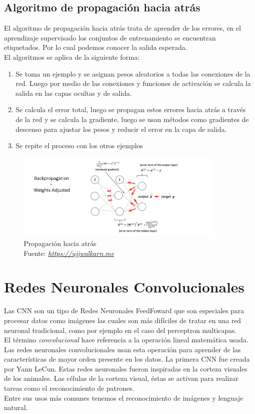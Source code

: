 \subsection{Algoritmo de propagación hacia atrás}
El algoritmo de propagación hacia atrás trata de aprender de los errores, en el aprendizaje supervisado los conjuntos de entrenamiento se encuentran etiquetados. Por lo cual podemos conocer la salida esperada. \\
El algoritmos se aplica de la siguiente forma:

\begin{enumerate}
	\item Se toma un ejemplo y se asignan pesos aleatorios a todas las conexiones de la red. Luego por medio de las conexiones y funciones de activación se calcula la salida en las capas ocultas y de salida.
	\item Se calcula el error total, luego se propagan estos errores hacia atrás a través de la red y se calcula la gradiente, luego se usan métodos como gradientes de descenso para ajustar los pesos y reducir el error en la capa de salida.
	\item Se repite el proceso con los otros ejemplos
\end{enumerate}
\begin{figure}[H]
	\centering
	\includegraphics[width=0.9\textwidth]{Figures/backp.png}
	\caption{Propagación hacia atrás \\ Fuente:  \href{https://ujjwalkarn.me/2016/08/09/quick-intro-neural-networks/}{\textit{https://ujjwalkarn.me}}}
	\label{backpropagation}
\end{figure} 

\section{Redes Neuronales Convolucionales}
Las CNN son un tipo de Redes Neuronales FeedFoward que son especiales para procesar datos como imágenes las cuales son más difíciles de tratar en una red neuronal tradicional, como por ejemplo en el caso del perceptron multicapas.\\ El término \textit{convolucional} hace referencia a la operación lineal matemática usada. Las redes neuronales convolucionales usan esta operación para aprender de las características de mayor orden presente en los datos.
La primera CNN fue creada por Yann LeCun. Estas redes neuronales fueron inspiradas en la corteza visuales de los animales. Las células de la corteza visual, éstas se activan para realizar tareas como el reconocimiento de patrones.\\  Entre sus usos más comunes tenemos el reconocimiento de imágenes y lenguaje natural.\\
